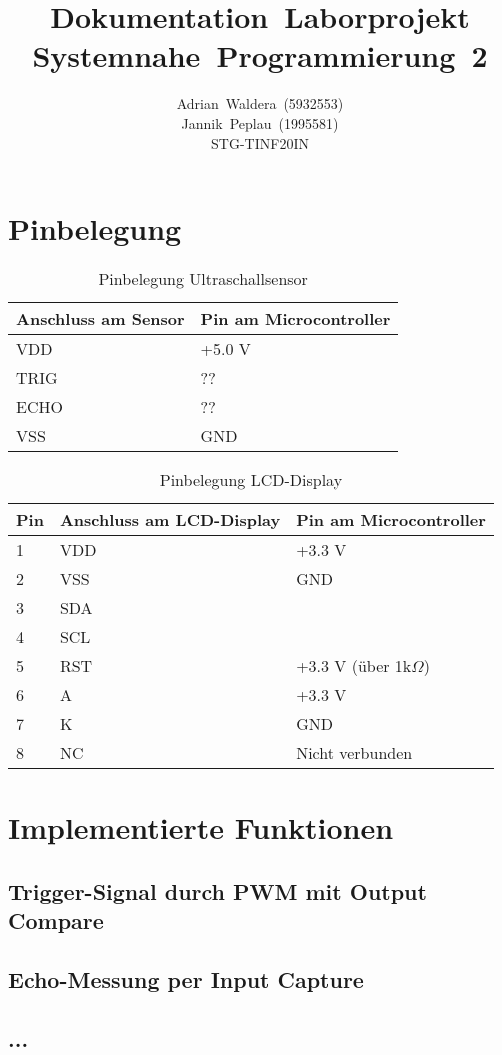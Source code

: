 \documentclass[german]{article}
\title{\textbf{Dokumentation~Laborprojekt\\Systemnahe~Programmierung~2}}
\author{
    Adrian~Waldera~(5932553) \\
    Jannik~Peplau~(1995581) \\
    STG-TINF20IN\\
}
\begin{document}
\maketitle

\section{Pinbelegung}

\begin{table}[H]\centering\begin{tabular}{|l|l|}
\hline
Anschluss am Sensor & Pin am Microcontroller\\\hline
VDD & +5.0 V\\\hline
TRIG & ??\\\hline
ECHO & ??\\\hline
VSS & GND\\\hline
\end{tabular}\caption{Pinbelegung Ultraschallsensor}\end{table}\label{tab-pinsus}

\begin{table}[H]\centering\begin{tabular}{|l|l|l|}
\hline
Pin & Anschluss am LCD-Display & Pin am Microcontroller\\\hline
1 & VDD & +3.3 V\\\hline
2 & VSS & GND\\\hline
3 & SDA & \\\hline
4 & SCL & \\\hline
5 & RST & +3.3 V (über 1k$\Omega$)\\\hline
6 & A & +3.3 V\\\hline
7 & K & GND \\\hline
8 & NC & Nicht verbunden\\\hline
\end{tabular}\caption{Pinbelegung LCD-Display}\end{table}\label{tab-pinsdp}

\section{Implementierte Funktionen}
\subsection{Trigger-Signal durch PWM mit Output Compare}

\subsection{Echo-Messung per Input Capture}

\subsection{...}
\end{document}
